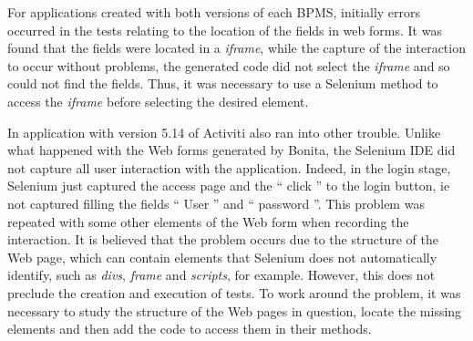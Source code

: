 \documentclass[runningheads,a4paper]{llncs}
\begin{document}
For applications created with both versions of each BPMS, initially errors occurred in the tests relating to the location of the fields in web forms. It was found that the fields were located in a \emph{iframe}, while the capture of the interaction to occur without problems, the generated code did not select the \emph{iframe} and so could not find the fields. Thus, it was necessary to use a Selenium method to access the \emph{iframe} before selecting the desired element.


In application with version 5.14 of Activiti also ran into other trouble. Unlike what happened with the Web forms generated by Bonita, the Selenium IDE did not capture all user interaction with the application. Indeed, in the login stage, Selenium just captured the access page and the `` click '' to the login button, ie not captured filling the fields `` User '' and `` password ''. This problem was repeated with some other elements of the Web form when recording the interaction. It is believed that the problem occurs due to the structure of the Web page, which can contain elements that Selenium does not automatically identify, such as \emph{divs}, \emph{frame} and \emph{scripts}, for example. However, this does not preclude the creation and execution of tests. To work around the problem, it was necessary to study the structure of the Web pages in question, locate the missing elements and then add the code to access them in their methods. 
\end{document}
